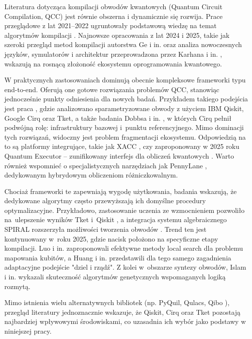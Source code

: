 Literatura dotycząca kompilacji obwodów kwantowych (Quantum Circuit Compilation, QCC) jest równie obszerna i dynamicznie się rozwija. Prace przeglądowe z lat 2021–2022 ugruntowały podstawową wiedzę na temat algorytmów kompilacji \cite{Huang2022,Kusyk2021,Tan2021}. Najnowsze opracowania z lat 2024 i 2025, takie jak szeroki przegląd metod kompilacji autorstwa Ge i in. \cite{Ge2024} oraz analiza nowoczesnych języków, symulatorów i architektur przeprowadzona przez Karhana i in. \cite{karhan_modern_2025}, wskazują na rosnącą złożoność ekosystemu oprogramowania kwantowego.

W praktycznych zastosowaniach dominują obecnie kompleksowe frameworki typu end-to-end. Oferują one gotowe rozwiązania problemów QCC, stanowiąc jednocześnie punkty odniesienia dla nowych badań. Przykładem takiego podejścia jest praca \cite{Younis2022}, gdzie analizowano sparametryzowane obwody z użyciem IBM Qiskit, Google Cirq oraz Tket, a także badania Dobbsa i in. \cite{Dobbs2025}, w których Cirq pełnił podwójną rolę: infrastruktury bazowej i~punktu referencyjnego. Mimo dominacji tych rozwiązań, widoczny jest problem fragmentacji ekosystemu. Odpowiedzią na to są platformy integrujące, takie jak XACC \cite{mccaskey2019xaccsystemlevelsoftwareinfrastructure}, czy zaproponowany w 2025 roku Quantum Executor – zunifikowany interfejs dla obliczeń kwantowych \cite{bisicchia_quantum_2025}. Warto również wspomnieć o specjalistycznych narzędziach jak PennyLane \cite{bergholm2022pennylaneautomaticdifferentiationhybrid}, dedykowanym hybrydowym obliczeniom różniczkowalnym.

Chociaż frameworki te zapewniają wygodę użytkowania, badania wskazują, że dedykowane algorytmy często przewyższają ich domyślne procedury optymalizacyjne. Przykładowo, zastosowanie uczenia ze wzmocnieniem pozwoliło na~ulepszenie wyników Tket i~Qiskit \cite{Quetschlich2023}, a integracja systemu algebraicznego SPIRAL rozszerzyła możliwości tworzenia obwodów \cite{Mionis2021}. Trend ten jest kontynuowany w~roku 2025, gdzie nacisk położono na specyficzne etapy kompilacji. Luo i in. \cite{luo_towards_2025} zaproponowali efektywne metody local search dla problemu mapowania kubitów, a Huang i in. \cite{huang_qubit_2025} przedstawili dla tego samego zagadnienia adaptacyjne podejście "dziel i rządź". Z kolei w~obszarze syntezy obwodów, Islam i in. \cite{islam_quantum_2025} wykazali skuteczność algorytmów genetycznych wspomaganych logiką rozmytą.

Mimo istnienia wielu alternatywnych bibliotek (np. PyQuil, Qulacs, Qibo \cite{Rakyta2024}), przegląd literatury jednoznacznie wskazuje, że Qiskit, Cirq oraz Tket pozostają najbardziej wpływowymi środowiskami, co uzasadnia ich wybór jako podstawy w niniejszej pracy.

